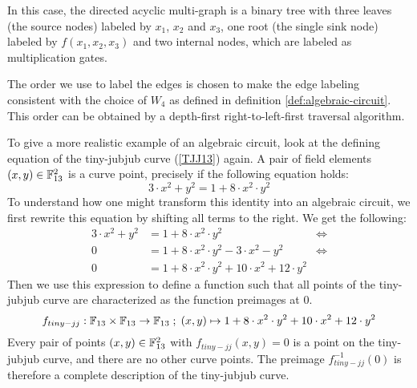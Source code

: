 \begin{example}
In this case, the directed acyclic multi-graph is a binary tree with three leaves (the source nodes) labeled by $x_1$, $x_2$ and $x_3$, one root (the single sink node) labeled by $f(x_1,x_2,x_3)$ and two internal nodes, which are labeled as multiplication gates. 

The order we use to label the edges is chosen to make the edge labeling consistent with the choice of $W_4$ as defined in definition \ref{def:algebraic-circuit}. This order can be obtained by a depth-first right-to-left-first traversal algorithm.
\end{example}
\begin{example} To give a more realistic example of an algebraic circuit, look at the defining equation  of the tiny-jubjub curve (\ref{TJJ13}) again. A pair of field elements 
$(x,y)\in \mathbb{F}_{13}^2$ is a curve point, precisely if the following equation holds:
$$
3\cdot x^2 + y^2 = 1+ 8\cdot x^2\cdot y^2
$$ 
To understand how one might transform this identity into an algebraic circuit, we first rewrite this equation by shifting all terms to the right. We get the following:
\begin{align*}
3\cdot x^2 + y^2 & = 1+ 8\cdot x^2\cdot y^2 & \Leftrightarrow\\
0 & = 1+ 8\cdot x^2\cdot y^2 - 3\cdot x^2 - y^2 & \Leftrightarrow\\
0 & = 1+ 8\cdot x^2\cdot y^2 + 10\cdot x^2 +12\cdot y^2
\end{align*}
Then we use this expression to define a function such that all points of the tiny-jubjub curve are characterized as the function preimages at $0$.
$$
f_{tiny-jj}: \mathbb{F}_{13}\times \mathbb{F}_{13}\to \mathbb{F}_{13}\; ; \;
(x,y)\mapsto 1+ 8\cdot x^2\cdot y^2 + 10\cdot x^2 +12\cdot y^2
$$
Every pair of points $(x,y)\in \mathbb{F}_{13}^2$ with $f_{tiny-jj}(x,y)=0$ is a point on the tiny-jubjub curve, and there are no other curve points. The preimage $f_{tiny-jj}^{-1}(0)$ is therefore a complete description of the tiny-jubjub curve.


\end{example}
